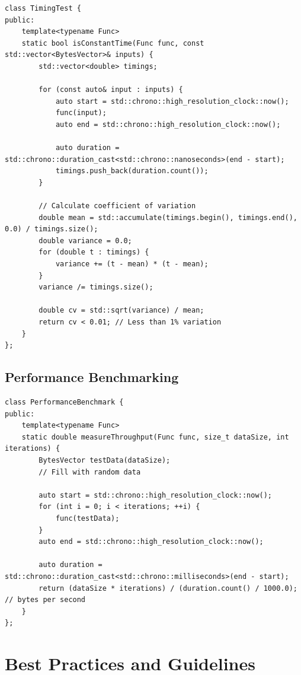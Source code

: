 \documentclass[11pt,a4paper]{article}
\begin{document}
\begin{lstlisting}
class TimingTest {
public:
    template<typename Func>
    static bool isConstantTime(Func func, const std::vector<BytesVector>& inputs) {
        std::vector<double> timings;
        
        for (const auto& input : inputs) {
            auto start = std::chrono::high_resolution_clock::now();
            func(input);
            auto end = std::chrono::high_resolution_clock::now();
            
            auto duration = std::chrono::duration_cast<std::chrono::nanoseconds>(end - start);
            timings.push_back(duration.count());
        }
        
        // Calculate coefficient of variation
        double mean = std::accumulate(timings.begin(), timings.end(), 0.0) / timings.size();
        double variance = 0.0;
        for (double t : timings) {
            variance += (t - mean) * (t - mean);
        }
        variance /= timings.size();
        
        double cv = std::sqrt(variance) / mean;
        return cv < 0.01; // Less than 1% variation
    }
};
\end{lstlisting}

\subsection{Performance Benchmarking}

\begin{lstlisting}
class PerformanceBenchmark {
public:
    template<typename Func>
    static double measureThroughput(Func func, size_t dataSize, int iterations) {
        BytesVector testData(dataSize);
        // Fill with random data
        
        auto start = std::chrono::high_resolution_clock::now();
        for (int i = 0; i < iterations; ++i) {
            func(testData);
        }
        auto end = std::chrono::high_resolution_clock::now();
        
        auto duration = std::chrono::duration_cast<std::chrono::milliseconds>(end - start);
        return (dataSize * iterations) / (duration.count() / 1000.0); // bytes per second
    }
};
\end{lstlisting}

\section{Best Practices and Guidelines}
\end{document}
